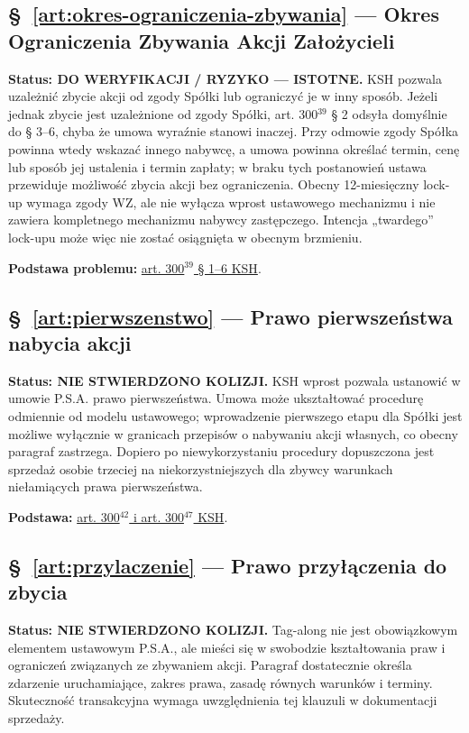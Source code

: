 \documentclass[12pt,a4paper]{report}
\newcounter{paragraf}
\begin{document}
\subsection*{§~\ref{art:okres-ograniczenia-zbywania} — Okres Ograniczenia Zbywania Akcji Założycieli}
\textbf{Status: DO WERYFIKACJI / RYZYKO — ISTOTNE.} KSH pozwala uzależnić zbycie akcji od zgody Spółki lub ograniczyć je w inny sposób. Jeżeli jednak zbycie jest uzależnione od zgody Spółki, art. 300$^{39}$ § 2 odsyła domyślnie do § 3--6, chyba że umowa wyraźnie stanowi inaczej. Przy odmowie zgody Spółka powinna wtedy wskazać innego nabywcę, a umowa powinna określać termin, cenę lub sposób jej ustalenia i termin zapłaty; w braku tych postanowień ustawa przewiduje możliwość zbycia akcji bez ograniczenia. Obecny 12-miesięczny lock-up wymaga zgody WZ, ale nie wyłącza wprost ustawowego mechanizmu i nie zawiera kompletnego mechanizmu nabywcy zastępczego. Intencja „twardego” lock-upu może więc nie zostać osiągnięta w obecnym brzmieniu.

\textbf{Podstawa problemu:} \href{https://eli.gov.pl/api/acts/DU/2024/18/text.html}{art. 300$^{39}$ § 1--6 KSH}.

\subsection*{§~\ref{art:pierwszenstwo} — Prawo pierwszeństwa nabycia akcji}
\textbf{Status: NIE STWIERDZONO KOLIZJI.} KSH wprost pozwala ustanowić w umowie P.S.A. prawo pierwszeństwa. Umowa może ukształtować procedurę odmiennie od modelu ustawowego; wprowadzenie pierwszego etapu dla Spółki jest możliwe wyłącznie w granicach przepisów o nabywaniu akcji własnych, co obecny paragraf zastrzega. Dopiero po niewykorzystaniu procedury dopuszczona jest sprzedaż osobie trzeciej na niekorzystniejszych dla zbywcy warunkach niełamiących prawa pierwszeństwa.

\textbf{Podstawa:} \href{https://eli.gov.pl/api/acts/DU/2024/18/text.html}{art. 300$^{42}$ i art. 300$^{47}$ KSH}.

\subsection*{§~\ref{art:przylaczenie} — Prawo przyłączenia do zbycia}
\textbf{Status: NIE STWIERDZONO KOLIZJI.} Tag-along nie jest obowiązkowym elementem ustawowym P.S.A., ale mieści się w swobodzie kształtowania praw i ograniczeń związanych ze zbywaniem akcji. Paragraf dostatecznie określa zdarzenie uruchamiające, zakres prawa, zasadę równych warunków i terminy. Skuteczność transakcyjna wymaga uwzględnienia tej klauzuli w dokumentacji sprzedaży.
\end{document}
